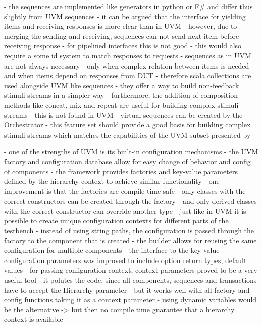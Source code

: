 - the sequences are implemented like generators in python or F\# and differ thus slightly from UVM sequences
- it can be argued that the interface for yielding items and receiving responses is more clear than in UVM
- however, due to merging the sending and receiving, sequences can not send next item before receiving response
- for pipelined interfaces this is not good
- this would also require a some id system to match responses to requests
- sequences as in UVM are not always necessary
  - only when complex relation between items is needed
  - and when items depend on responses from DUT
- therefore scala collections are used alongside UVM like sequences
- they offer a way to build non-feedback stimuli streams in a simpler way
- furthermore, the addition of composition methods like concat, mix and repeat are useful for building complex stimuli streams
- this is not found in UVM
- virtual sequences can be created by the Orchestrator
- this feature set should provide a good basis for building complex stimuli streams which matches the capabilities of the UVM subset presented by \citeauthor{sutherland2015uvm}



- one of the strengths of UVM is its built-in configuration mechanisms 
- the UVM factory and configuration database allow for easy change of behavior and config of components
- the framework provides factories and key-value parameters defined by the hierarchy context to achieve similar functionality
- one improvement is that the factories are compile time safe
- only classes with the correct constructors can be created through the factory
- and only derived classes with the correct constructor can override another type
- just like in UVM it is possible to create unique configuration contexts for different parts of the testbench
- instead of using string paths, the configuration is passed through the factory to the component that is created
- the builder allows for reusing the same configuration for multiple components
- the interface to the key-value configuration parameters was improved to include option return types, default values
- for passing configuration context, context parameters proved to be a very useful tool
- it polutes the code, since all components, sequences and transactions have to accept the Hierarchy parameter
- but it works well with all factory and config functions taking it as a context parameter
- using dynamic variables would be the alternative -> but then no compile time guarantee that a hierarchy context is available

